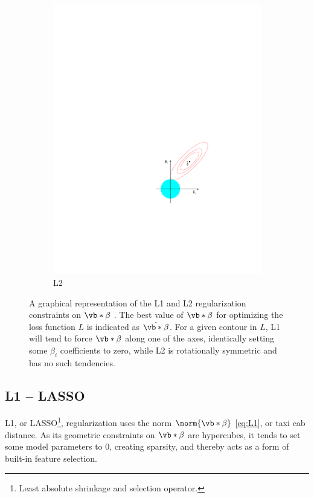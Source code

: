 \begin{figure}[H]
\begin{subfigure}[b]{0.48\textwidth}
      \includegraphics[width=\textwidth]{figures/ml/l2}
  \caption{L2}
  \label{fig:ml:l1l2:L2}
  \end{subfigure}
\caption{
A graphical representation of the L1 and L2 regularization constraints on $\vb*{\beta}$ \cite{HastieTF09}.
The best value of $\vb*{\beta}$ for optimizing the loss function $L$ is indicated as $\hat{\vb*{\beta}}$.
For a given contour in $L$, L1 will tend to force $\vb*{\beta}$ along one of the axes,
identically setting some $\beta_{i}$ coefficients to zero,
while L2 is rotationally symmetric and has no such tendencies.
\label{fig:ml:l1l2}
}
\end{figure}

\subsection{L1 -- LASSO}
\label{ml_general:reg:L1}

L1, or LASSO\footnote{Least absolute shrinkage and selection operator.},
regularization uses the norm $\norm{\vb*{\beta}}$ \cref{eq:L1}, or taxi cab distance.
As its geometric constraints on $\vb*{\beta}$ are hypercubes,
it tends to set some model parameters to 0, creating sparsity,
and thereby acts as a form of built-in feature selection.

